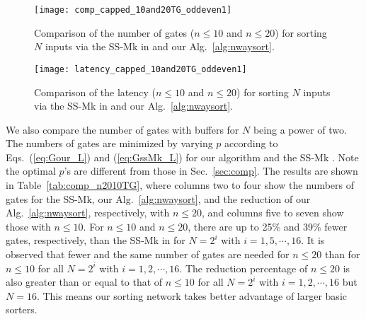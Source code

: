 \documentclass[10pt,journal,cspaper,compsoc]{IEEEtran}
\begin{document}
\begin{figure}[!t]
\centering
\texttt{[image: comp\_capped\_10and20TG\_oddeven1]}
\caption{Comparison of the number of gates ($n\le 10$ and $n\le 20$) for sorting $N$ inputs via the SS-Mk in \cite{gao1997sloping} and our Alg.~\ref{alg:nwaysort}.}
\label{fig:comp_cap_n1020TG}
\end{figure}

\begin{figure}[!t]
\centering
\texttt{[image: latency\_capped\_10and20TG\_oddeven1]}
\caption{Comparison of the latency ($n\le 10$ and $n\le 20$) for sorting $N$ inputs via the SS-Mk in \cite{gao1997sloping} and our Alg.~\ref{alg:nwaysort}.}
\label{fig:latency_cap_n1020TG}
\end{figure}

We also compare the number of gates with buffers for $N$ being a power of two.
The numbers of gates are minimized by varying $p$ according to Eqs.~(\ref{eq:Gour_L}) and (\ref{eq:GssMk_L}) for our algorithm and the SS-Mk \cite{gao1997sloping}. Note the optimal $p$'s are different from those in Sec.~\ref{sec:comp}.
The results are shown in Table~\ref{tab:comp_n2010TG}, where columns two to four show the numbers of gates for the SS-Mk, our Alg.~\ref{alg:nwaysort}, and the reduction of our Alg.~\ref{alg:nwaysort}, respectively, with $n\le 20$, and columns five to seven show those with $n\le 10$. For $n\le 10$ and $n\le 20$, there are up to 25\% and 39\% fewer gates, respectively, than the SS-Mk in \cite{gao1997sloping} for $N = 2^i$ with $i=1,5,\cdots,16$.
It is observed that fewer and the same number of gates are needed for $n\le 20$ than for $n\le 10$ for all $N=2^i$ with $i=1,2,\cdots,16$. The reduction percentage of $n\le 20$ is also greater than or equal to that of $n\le 10$ for all $N=2^i$ with $i=1,2,\cdots,16$ but $N=16$.
This means our sorting network takes better advantage of larger basic sorters.
\end{document}
